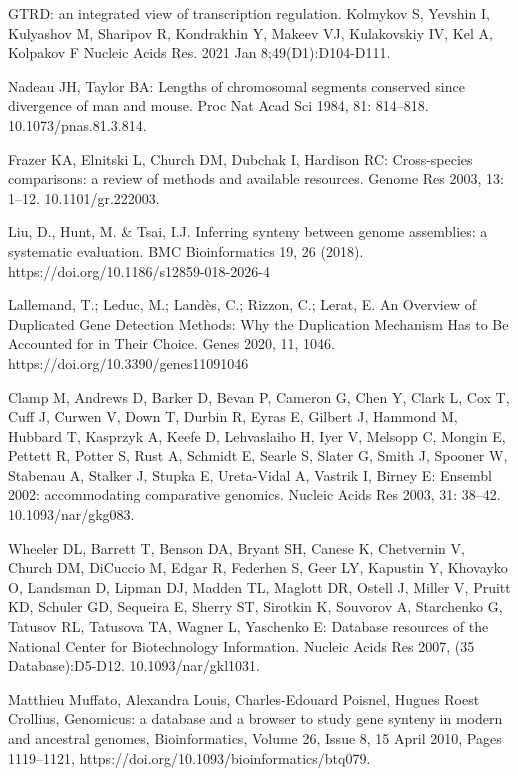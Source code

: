 \documentclass[12pt]{article}
\begin{document}

\begin{thebibliography}{99}

 GTRD: an integrated view of transcription regulation.
Kolmykov S, Yevshin I, Kulyashov M, Sharipov R, Kondrakhin Y, Makeev VJ,
Kulakovskiy IV, Kel A, Kolpakov F Nucleic Acids Res. 2021 Jan
8;49(D1):D104-D111.

 Nadeau JH, Taylor BA: Lengths of chromosomal segments
conserved since divergence of man and mouse. Proc Nat Acad Sci 1984,
81: 814–818. 10.1073/pnas.81.3.814.

 Frazer KA, Elnitski L, Church DM, Dubchak I, Hardison RC:
Cross-species comparisons: a review of methods and available resources.
Genome Res 2003, 13: 1–12. 10.1101/gr.222003.

 Liu, D., Hunt, M. \& Tsai, I.J. Inferring synteny between
genome assemblies: a systematic evaluation. BMC Bioinformatics 19, 26 (2018).
https://doi.org/10.1186/s12859-018-2026-4

 Lallemand, T.; Leduc, M.; Landès, C.; Rizzon, C.; Lerat, E.
An Overview of Duplicated Gene Detection Methods: Why the Duplication Mechanism
Has to Be Accounted for in Their Choice. Genes 2020, 11, 1046.
https://doi.org/10.3390/genes11091046

 Clamp M, Andrews D, Barker D, Bevan P, Cameron G, Chen Y,
Clark L, Cox T, Cuff J, Curwen V, Down T, Durbin R, Eyras E, Gilbert J,
Hammond M, Hubbard T, Kasprzyk A, Keefe D, Lehvaslaiho H, Iyer V, Melsopp C,
Mongin E, Pettett R, Potter S, Rust A, Schmidt E, Searle S, Slater G, Smith J,
Spooner W, Stabenau A, Stalker J, Stupka E, Ureta-Vidal A, Vastrik I, Birney E:
Ensembl 2002: accommodating comparative genomics. Nucleic Acids Res 2003,
31: 38–42. 10.1093/nar/gkg083.

 Wheeler DL, Barrett T, Benson DA, Bryant SH, Canese K,
Chetvernin V, Church DM, DiCuccio M, Edgar R, Federhen S, Geer LY, Kapustin Y,
Khovayko O, Landsman D, Lipman DJ, Madden TL, Maglott DR, Ostell J, Miller V,
Pruitt KD, Schuler GD, Sequeira E, Sherry ST, Sirotkin K, Souvorov A,
Starchenko G, Tatusov RL, Tatusova TA, Wagner L, Yaschenko E: Database
resources of the National Center for Biotechnology Information. Nucleic Acids
Res 2007, (35 Database):D5-D12. 10.1093/nar/gkl1031.

 Matthieu Muffato, Alexandra Louis, Charles-Edouard Poisnel,
Hugues Roest Crollius, Genomicus: a database and a browser to study gene
synteny in modern and ancestral genomes, Bioinformatics, Volume 26, Issue 8,
15 April 2010, Pages 1119–1121, https://doi.org/10.1093/bioinformatics/btq079.


\end{thebibliography}
\end{document}
